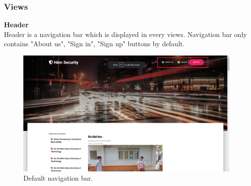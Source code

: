 \subsubsection{Views}
\textbf{Header}
\\
Header is a navigation bar which is displayed in every views. Navigation bar only contains "About us", "Sign in", "Sign up" buttons by default.
\begin{center}
    \begin{figure}[H]
    \centering
    \includegraphics[width=1\columnwidth]{images/chap4/header_not_login.png}
    \caption{Default navigation bar.}
    \end{figure}
\end{center}

